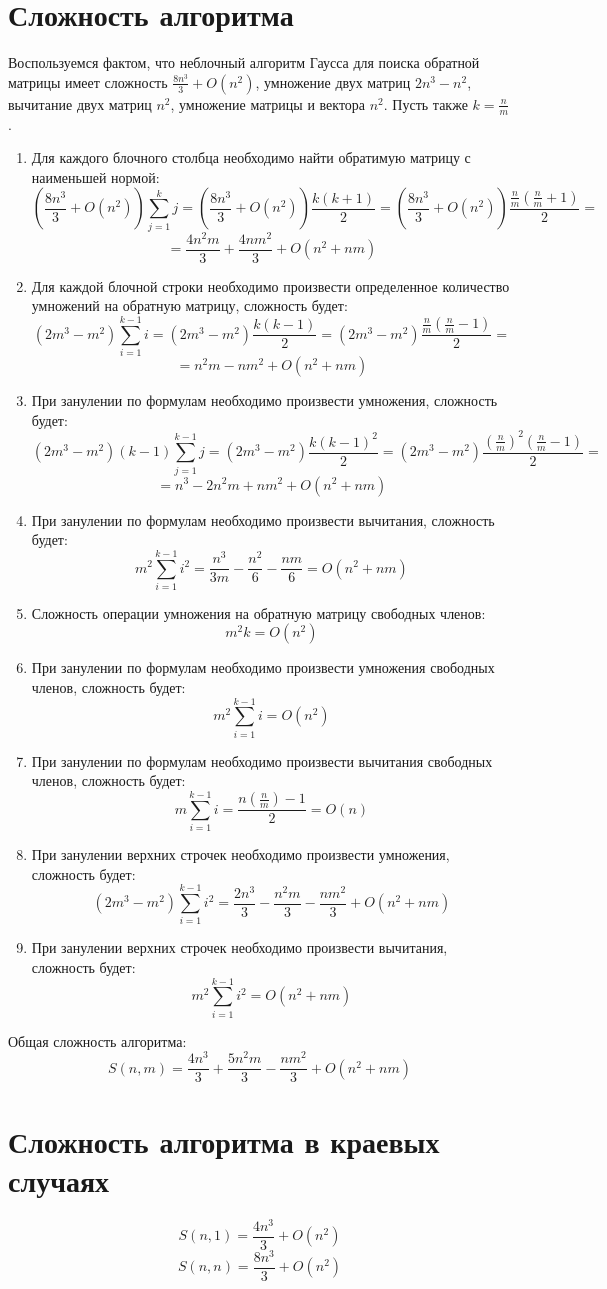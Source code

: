 \documentclass[a4paper,12pt]{article}
\begin{document}
\section{Сложность алгоритма}
Воспользуемся фактом, что неблочный алгоритм Гаусса для поиска обратной матрицы имеет сложность $\frac{8n^3}{3}+O(n^2)$,  умножение двух матриц $2n^3-n^2$, вычитание двух матриц $n^2$, умножение матрицы и вектора $n^2$. Пусть также $k=\frac{n}{m}$.
\begin{enumerate}
    \item Для каждого блочного столбца необходимо найти обратимую матрицу с наименьшей нормой: 
$$
    (\frac{8n^3}{3}+O(n^2))\sum^k_{j=1}j=(\frac{8n^3}{3}+O(n^2))\frac{k(k+1)}{2}=(\frac{8n^3}{3}+O(n^2))\frac{\frac{n}{m}(\frac{n}{m}+1)}{2}=
$$
$$
=\frac{4n^2m}{3}+\frac{4nm^2}{3}+O(n^2+nm)
$$
    \item Для каждой блочной строки необходимо произвести определенное количество умножений на обратную матрицу, сложность будет: 
$$
    (2m^3-m^2)\sum^{k-1}_{i=1}i=(2m^3-m^2)\frac{k(k-1)}{2}=(2m^3-m^2)\frac{\frac{n}{m}(\frac{n}{m}-1)}{2}=
$$
$$
=n^2m-nm^2+O(n^2+nm)
$$
    \item При занулении по формулам необходимо произвести умножения, сложность будет: 
$$
    (2m^3-m^2)(k-1)\sum^{k-1}_{j=1}j=(2m^3-m^2)\frac{k(k-1)^2}{2}=(2m^3-m^2)\frac{(\frac{n}{m})^2(\frac{n}{m}-1)}{2}=
$$
$$
    =n^3-2n^2m+nm^2+O(n^2+nm)
$$
    \item   При занулении по формулам необходимо произвести вычитания, сложность будет:
$$
    m^2\sum^{k-1}_{i=1}i^2=\frac{n^3}{3m}-\frac{n^2}{6}-\frac{nm}{6}=O(n^2+nm)
$$
\item Сложность операции умножения на обратную матрицу свободных членов:
$$
    m^2k=O(n^2)
$$
\item При занулении по формулам необходимо произвести умножения свободных членов, сложность будет:
$$
    m^2\sum^{k-1}_{i=1}i=O(n^2)
$$
\item При занулении по формулам необходимо произвести вычитания свободных членов, сложность будет:
$$
    m\sum^{k-1}_{i=1}i=\frac{n(\frac{n}{m})-1}{2}=O(n)
$$
\item При занулении верхних строчек необходимо произвести умножения, сложность будет:
$$
    (2m^3-m^2)\sum^{k-1}_{i=1}i^2=\frac{2n^3}{3}-\frac{n^2m}{3}-\frac{nm^2}{3}+O(n^2+nm)
$$
\item При занулении верхних строчек необходимо произвести вычитания, сложность будет:
$$
    m^2\sum^{k-1}_{i=1}i^2=O(n^2+nm)
$$
\end{enumerate}
Общая сложность алгоритма:
$$
    S(n,m)=\frac{4n^3}{3}+\frac{5n^2m}{3}-\frac{nm^2}{3}+O(n^2+nm)
$$
\section{Сложность алгоритма в краевых случаях}
$$
    S(n,1)=\frac{4n^3}{3}+O(n^2)
$$
$$
    S(n,n)=\frac{8n^3}{3}+O(n^2)
$$
\end{document}

